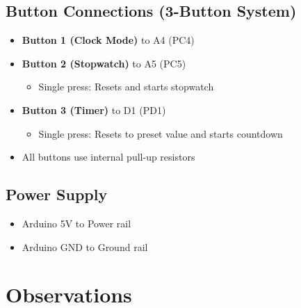 \documentclass{article}
\begin{document}
\subsection{Button Connections (3-Button System)}
\begin{itemize}
    \item \textbf{Button 1 (Clock Mode)} to A4 (PC4)
    \item \textbf{Button 2 (Stopwatch)} to A5 (PC5)
    \begin{itemize}
        \item Single press: Resets and starts stopwatch
    \end{itemize}
    \item \textbf{Button 3 (Timer)} to D1 (PD1)
    \begin{itemize}
        \item Single press: Resets to preset value and starts countdown
    \end{itemize}
    \item All buttons use internal pull-up resistors
\end{itemize}

\subsection{Power Supply}
\begin{itemize}
    \item Arduino 5V to Power rail
    \item Arduino GND to Ground rail
\end{itemize}

\section{Observations}
\end{document}
